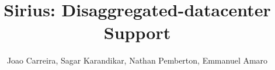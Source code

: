 \documentclass[10pt,twocolumn]{article}
\begin{document}
\title{\bf Sirius: Disaggregated-datacenter Support}
\author{Joao Carreira, Sagar Karandikar, Nathan Pemberton, Emmanuel Amaro}
\date{}
\maketitle
\thispagestyle{empty}












\end{document}
